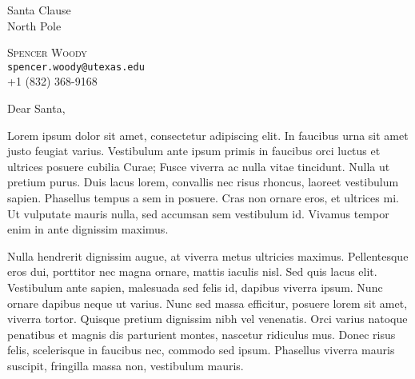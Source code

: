 \documentclass[12pt]{letter}
\begin{document}

\begin{letter}{Santa Clause \\
North Pole \\
}


\begin{center}
\large \textsc{Spencer Woody} \\ 
\small \texttt{spencer.woody@utexas.edu} \\ +1 (832) 368-9168 
\end{center} 

\bigskip

\signature{Spencer Woody \\ PhD Student}


\opening{Dear Santa,} 



Lorem ipsum dolor sit amet, consectetur adipiscing elit. In faucibus
urna sit amet justo feugiat varius. Vestibulum ante ipsum primis in
faucibus orci luctus et ultrices posuere cubilia Curae; Fusce viverra
ac nulla vitae tincidunt. Nulla ut pretium purus. Duis lacus lorem,
convallis nec risus rhoncus, laoreet vestibulum sapien. Phasellus
tempus a sem in posuere. Cras non ornare eros, et ultrices mi. Ut
vulputate mauris nulla, sed accumsan sem vestibulum id. Vivamus tempor
enim in ante dignissim maximus.

Nulla hendrerit dignissim augue, at viverra metus ultricies
maximus. Pellentesque eros dui, porttitor nec magna ornare, mattis
iaculis nisl. Sed quis lacus elit. Vestibulum ante sapien, malesuada
sed felis id, dapibus viverra ipsum. Nunc ornare dapibus neque ut
varius. Nunc sed massa efficitur, posuere lorem sit amet, viverra
tortor. Quisque pretium dignissim nibh vel venenatis. Orci varius
natoque penatibus et magnis dis parturient montes, nascetur ridiculus
mus. Donec risus felis, scelerisque in faucibus nec, commodo sed
ipsum. Phasellus viverra mauris suscipit, fringilla massa non,
vestibulum mauris.


\end{letter}
\end{document}
